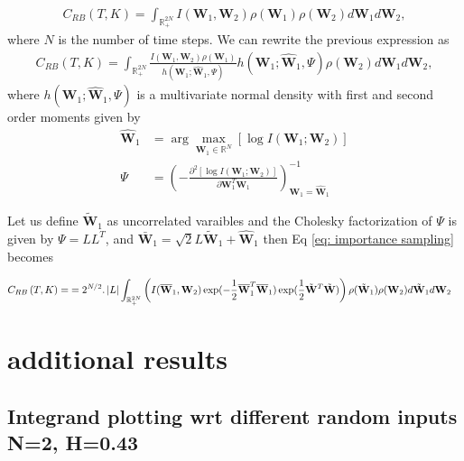 \documentclass[11pt]{article}
\newcommand{\rset}{\mathbb{R}}
\newcommand{\COMMA}{,}
\begin{document}
\begin{align}
	C_{RB}\left( T, K \right)=  \int_{\rset_+^{2N}} I(\mathbf{W}_1,\mathbf{W}_2)  \rho(\mathbf{W}_1) \rho(\mathbf{W}_2) d \mathbf{W}_1  d\mathbf{W}_2 \COMMA
\end{align}
where $N$ is the number of time steps. We can rewrite the previous expression as
\begin{align}\label{eq: importance sampling}
	C_{RB}\left( T, K \right)=  \int_{\rset_+^{2N}} \frac{I(\mathbf{W}_1,\mathbf{W}_2)\rho(\mathbf{W}_1)}{h(\mathbf{W}_1;\hat{\mathbf{W}}_1,\Psi)} {h(\mathbf{W}_1;\hat{\mathbf{W}}_1,\Psi)} \rho(\mathbf{W}_2) d \mathbf{W}_1  d\mathbf{W}_2 \COMMA
\end{align}
where $h(\mathbf{W}_1;\hat{\mathbf{W}}_1,\Psi)$ is a multivariate normal density with first and second order moments given by
\begin{align}\label{eq:Gaussian moments}
	\hat{\mathbf{W}}_1&=\operatorname{arg} \underset{\mathbf{W}_1 \in \rset^{N} }{\max}	[ \log I(\mathbf{W}_1;\mathbf{W}_2)] \\
	\Psi &=\left(- \frac{\partial^2[\log I(\mathbf{W}_1;\mathbf{W}_2)]}{\partial \mathbf{W}_1^{T} \mathbf{W}_1} \right)^{-1}_{\mathbf{W}_1=\hat{\mathbf{W}}_1}
\end{align}

Let us define $\tilde{\mathbf{W}}_1$ as uncorrelated varaibles and the Cholesky factorization of $\Psi$ is given by $\Psi=L L^{T}$, and $\bar{\mathbf{W}}_1=\sqrt{2} L \tilde{\mathbf{W}}_1+\hat{\mathbf{W}}_1$ then Eq \ref{eq: importance sampling} becomes 

\begin{align}
	C_{RB}\left( T, K \right)=&= 2^{N/2}. \abs{L} \int_{\rset_+^{2N}} \left( I(\bar{\mathbf{W}}_1,\mathbf{W}_2)  \exp(-\frac{1}{2}\bar{\mathbf{W}}_1^T \bar{\mathbf{W}}_1) \exp(\frac{1}{2}\tilde{\mathbf{W}}^T \tilde{\mathbf{W}}) \right)   \rho(\tilde{\mathbf{W}}_1) \rho(\mathbf{W}_2) d \tilde{\mathbf{W}}_1 d\mathbf{W}_2 
\end{align}
\newpage
\section{additional results}
\subsection{Integrand plotting wrt different random inputs N=2, H=0.43}
\end{document}
